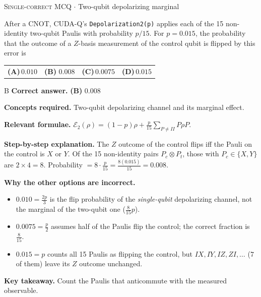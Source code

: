 \documentclass[11pt,a4paper]{article}
\newcommand{\optlabel}[1]{\textbf{(#1)}}
\newcommand{\correctlabel}[1]{\textcolor{okgreen}{\textbf{(#1)}\,\ding{51}}}
\newenvironment{qitem}[1]{\begin{list}{}{\setlength{\leftmargin}{3.3em}\setlength{\labelwidth}{3.1em}%
  \setlength{\labelsep}{0.2em}\setlength{\topsep}{3pt}\setlength{\parsep}{3pt}}\item[\textbf{Q.#1}\hfill]}{\end{list}}
\newcommand{\qsep}{\par\vspace{2pt}{\color{black!15}\hrule}\vspace{4pt}}
\newcommand{\qmeta}[2]{{\footnotesize\color{black!60}\textsc{#1} \;$\cdot$\; #2}\par}
\begin{document}
\begin{qitem}{33}
\qmeta{Single-correct MCQ}{Two-qubit depolarizing marginal}
After a CNOT, CUDA-Q's \texttt{Depolarization2(p)} applies each of the 15 non-identity two-qubit Paulis with probability $p/15$. For $p = 0.015$, the
probability that the outcome of a $Z$-basis measurement of the control qubit is flipped by this error is
\par\smallskip\noindent\begin{tabularx}{\linewidth}{@{}*{4}{L}@{}}
\optlabel{A}\,$0.010$ & \correctlabel{B}\,$0.008$ & \optlabel{C}\,$0.0075$ & \optlabel{D}\,$0.015$
\end{tabularx}
\end{qitem}
\begin{solbox}{B}
\textbf{\color{brand}Correct answer.} \textcolor{okgreen}{\textbf{(B)}} $0.008$

\textbf{\color{brand}Concepts required.} Two-qubit depolarizing channel and its marginal effect.

\textbf{\color{brand}Relevant formulae.} $\mathcal E_2(\rho) = (1-p)\rho + \frac{p}{15}\sum_{P\neq II}P\rho P$.

\textbf{\color{brand}Step-by-step explanation.} The $Z$ outcome of the control flips iff the Pauli on the control is $X$ or $Y$. Of the 15 non-identity pairs $P_c\otimes P_t$, those with
$P_c \in \{X, Y\}$ are $2\times4 = 8$. Probability $= 8\cdot\frac{p}{15} = \frac{8(0.015)}{15} = 0.008$.

\textbf{\color{brand}Why the other options are incorrect.}
\begin{itemize}[leftmargin=2.4em, itemsep=1pt, topsep=2pt]
\item[\textbf{(A)}] $0.010 = \frac{2p}{3}$ is the flip probability of the \emph{single-qubit} depolarizing channel, not the marginal of the two-qubit one ($\frac{8}{15}p$).
\item[\textbf{(C)}] $0.0075 = \frac p2$ assumes half of the Paulis flip the control; the correct fraction is $\frac{8}{15}$.
\item[\textbf{(D)}] $0.015 = p$ counts all 15 Paulis as flipping the control, but $IX, IY, IZ, ZI, \dots$ ($7$ of them) leave its $Z$ outcome unchanged.
\end{itemize}
\textbf{\color{brand}Key takeaway.} Count the Paulis that anticommute with the measured observable.
\end{solbox}
\qsep
\end{document}
